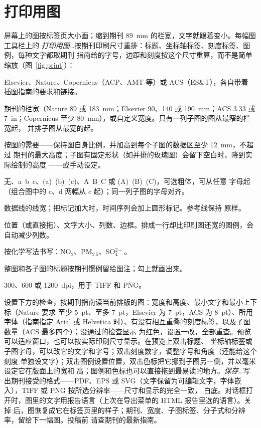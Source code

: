 \documentclass[11pt]{ctexrep}
\newcommand{\nosep}{\setlength{\itemsep}{0pt}\setlength{\parskip}{0pt}\setlength{\topsep}{2pt}}
\begin{document}
\section{打印用图}\label{sec:print}
屏幕上的图按标签页大小画；缩到期刊 89~mm 的栏宽，文字就跟着变小。每幅图工具栏上的
\emph{打印用图…}按期刊印刷尺寸重排：标题、坐标轴标签、刻度标签、图例，每种文字都取期刊
指南给的字号，边距和刻度按这个尺寸重算，而不是简单缩放（图~\ref{fig:print}）：
\begin{description}\nosep
  \item[期刊] Elsevier、Nature、Copernicus（ACP、AMT 等）或 ACS（ES\&T），各自带着
        插图指南的要求和链接。
  \item[宽度] 期刊的栏宽（Nature 89 或 183~mm；Elsevier 90、140 或 190~mm；ACS 3.33 或
        7~in；Copernicus 至少 80~mm），或自定义宽度。只有一列子图的图从最窄的栏宽起，
        并排子图从最宽的起。
  \item[高度] 按图的需要——保持图自身比例，并加高到每个子图的数据区至少 12~mm，不超过
        期刊的最大高度；子图有固定形状（如并排的玫瑰图）会留下空白时，降到实际绘制的高度
        ——或手动设定。
  \item[子图标签] 无、a~b~c、(a)~(b)~(c)、A~B~C 或 (A)~(B)~(C)，可选粗体，可从任意
        字母起（组合图中的 c、d 两幅从 c 起）；同一列子图的字母对齐。
  \item[线宽、标记大小] 数据线的线宽；把标记加大时，时间序列会加上圆形标记。参考线保持
        原样。
  \item[图例] 位置（或直接拖）、文字大小、列数、边框。排成一行却比印刷图还宽的图例，会
        自动减少列数。
  \item[分子式] 按化学写法书写：NO$_2$、PM$_{2.5}$、SO$_4^{2-}$。
  \item[标题] 整图和各子图的标题按期刊惯例留给图注；勾上就画出来。
  \item[栅格分辨率] 300、600 或 1200~dpi，用于 TIFF 和 PNG。
\end{description}
设置下方的检查，按期刊指南读当前排版的图：宽度和高度、最小文字和最小上下标（Nature 要求
至少 5~pt、至多 7~pt，Elsevier 为 7~pt，ACS 为 8~pt）、所用字体（指南指定 Arial 或
Helvetica 时）、有没有相互重叠的刻度标签，以及子图数量（ACS 最多四个）；没通过的检查显示
为红色，设置一改，全部重查。预览可以适应窗口，也可以按实际印刷尺寸显示。在预览上双击标题、
坐标轴标签或子图字母，可以改它的文字和字号；双击刻度数字，调整字号和角度（还能给这个刻度
单独设文字）；双击图例设置位置，双击色标把它挪到子图另一侧，并以毫米设定它在版面上的宽和
高；图例和色标也可以直接拖到最易读的地方。\emph{保存…}写出期刊接受的格式——PDF、EPS 或
SVG（文字保留为可编辑文字，字体嵌入），TIFF 或 PNG 按所选分辨率——尺寸和显示的完全一致，
白底。对话框打开时，图里的文字用报告语言（上次在导出菜单的 HTML 报告里选的语言）。关掉
后，图恢复成它在标签页里的样子；期刊、宽度、子图标签、分子式和分辨率，留给下一幅图。投稿前
请查期刊的最新指南。
\end{document}
